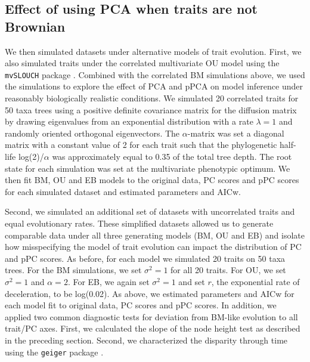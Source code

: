 \documentclass[a4paper,11pt]{article}
\begin{document}
\subsection{Effect of using PCA when traits are not Brownian}
We then simulated datasets under alternative models of trait evolution. First, we also simulated traits under the correlated multivariate OU model using the \texttt{mvSLOUCH} package \citep{Bartoszek2012}. Combined with the correlated BM simulations above, we used the simulations to explore the effect of PCA and pPCA on model inference under reasonably biologically realistic conditions. We simulated 20 correlated traits for 50 taxa trees using a positive definite covariance matrix for the diffusion matrix by drawing eigenvalues from an exponential distribution with a rate $\lambda = \text{1}$ and randomly oriented orthogonal eigenvectors. The $\alpha$-matrix was set a diagonal matrix with a constant value of 2 for each trait such that the phylogenetic half-life log(2)/$\alpha$ \citep{Hansen2008} was approximately equal to 0.35 of the total tree depth. The root state for each simulation was set at the multivariate phenotypic optimum. We then fit BM, OU and EB models to the original data, PC scores and pPC scores for each simulated dataset and estimated parameters and AICw. 

Second, we simulated an additional set of datasets with uncorrelated traits and equal evolutionary rates. These simplified datasets allowed us to generate comparable data under all three generating models (BM, OU and EB) and isolate how misspecifying the model of trait evolution can impact the distribution of PC and pPC scores. As before, for each model we simulated 20 traits on 50 taxa trees. For the BM simulations, we set $\sigma^2=\text{1}$ for all 20 traits. For OU, we set $\sigma^2=\text{1}$ and $\alpha=\text{2}$. For EB, we again set $\sigma^2=\text{1}$ and set $r$, the exponential rate of deceleration, to be log(0.02). As above, we estimated parameters and AICw for each model fit to original data, PC scores and pPC scores. In addition, we applied two common diagnostic tests for deviation from BM-like evolution to all trait/PC axes. First, we calculated the slope of the node height test as described in the preceding section. Second, we characterized the disparity through time \citep{Harmon2003} using the \texttt{geiger} package \citep{geiger2}. 
\end{document}
